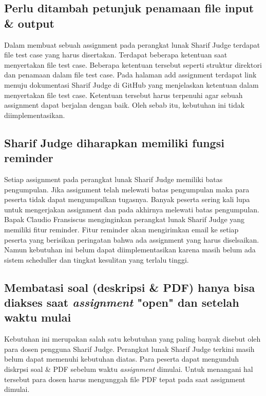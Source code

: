 \subsection{Perlu ditambah petunjuk penamaan file input & output}
Dalam membuat sebuah assignment pada perangkat lunak Sharif Judge terdapat file test case yang harus disertakan. Terdapat beberapa ketentuan  saat menyertakan file test case. Beberapa ketentuan tersebut seperti struktur direktori dan penamaan dalam file test case. Pada halaman add assignment terdapat link menuju dokumentasi Sharif Judge di GitHub yang menjelaskan ketentuan dalam menyertakan file test case. Ketentuan tersebut harus terpenuhi agar sebuah assignment dapat berjalan dengan baik. Oleh sebab itu, kebutuhan ini tidak diimplementasikan.



\subsection{Sharif Judge diharapkan memiliki fungsi reminder}
Setiap assignment pada perangkat lunak Sharif Judge memiliki batas pengumpulan. Jika assignment telah melewati batas pengumpulan maka para peserta tidak dapat mengumpulkan tugasnya. Banyak peserta sering kali lupa untuk mengerjakan assignment dan pada akhirnya melewati batas pengumpulan. Bapak Claudio Fransiscus menginginkan perangkat lunak Sharif Judge yang memiliki fitur reminder. Fitur reminder akan mengirimkan email ke setiap peserta yang berisikan peringatan bahwa ada assignment yang harus diselsaikan. Namun kebutuhan ini belum dapat diimplementasikan karena masih belum ada sistem scheduller dan tingkat kesulitan yang terlalu tinggi.

\subsection{Membatasi soal (deskripsi \& PDF) hanya bisa diakses saat \textit{assignment} "open" dan setelah waktu mulai}
Kebutuhan ini merupakan salah satu kebutuhan yang paling banyak disebut oleh para dosen pengguna Sharif Judge. Perangkat lunak Sharif Judge terkini masih belum dapat memenuhi kebutuhan diatas. Para peserta dapat mengunduh diskrpsi soal \& PDF sebelum waktu \textit{assignment} dimulai. Untuk menangani hal tersebut para dosen harus mengunggah file PDF tepat pada saat assignment dimulai.

